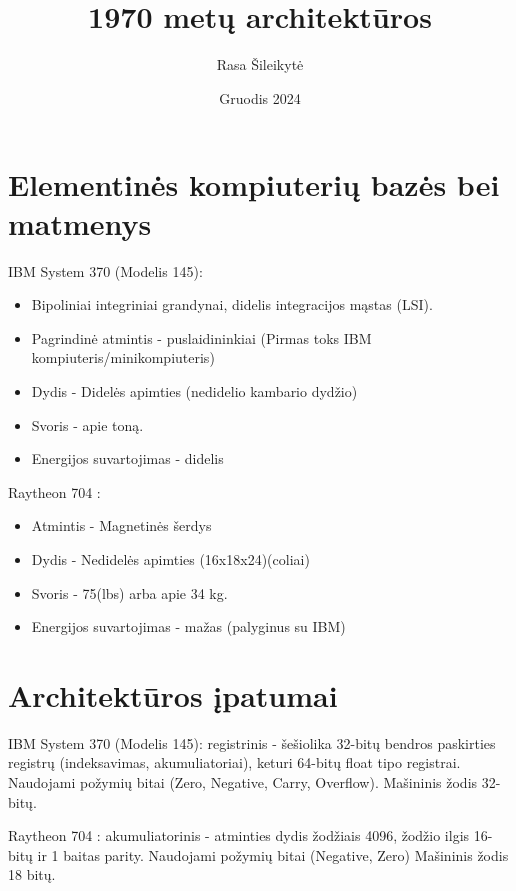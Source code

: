 \documentclass{article}
\title{\bold{IBM System 370 vs. Raytheon 704} \\1970 metų architektūros}
\author{Rasa Šileikytė}
\date{Gruodis 2024}
\begin{document}
\maketitle

\section*{Elementinės kompiuterių bazės bei matmenys}
\begin{multicols}{2}
IBM System 370 (Modelis 145):
\begin{itemize}
\item Bipoliniai integriniai grandynai, didelis integracijos mąstas (LSI).
\item Pagrindinė atmintis - puslaidininkiai (Pirmas toks IBM kompiuteris/minikompiuteris)
\item Dydis - Didelės apimties (nedidelio kambario dydžio)
\item Svoris - apie toną.
\item Energijos suvartojimas - didelis
\end{itemize}

\columnbreak

Raytheon 704 :
\begin{itemize}
\item Atmintis - Magnetinės šerdys
\item Dydis - Nedidelės apimties (16x18x24)(coliai)
\item Svoris - 75(lbs) arba apie 34 kg.
\item Energijos suvartojimas - mažas (palyginus su IBM)
\end{itemize}
\end{multicols}
\section*{Architektūros įpatumai}
\begin{multicols}{2}
IBM System 370 (Modelis 145): registrinis - šešiolika 32-bitų bendros paskirties registrų (indeksavimas, akumuliatoriai), keturi 64-bitų float tipo registrai. Naudojami požymių bitai (Zero, Negative, Carry, Overflow). Mašininis žodis 32-bitų.

\columnbreak
Raytheon 704 : akumuliatorinis - atminties dydis žodžiais 4096, žodžio ilgis 16-bitų ir 1 baitas parity. Naudojami požymių bitai (Negative, Zero) Mašininis žodis 18 bitų.
\end{multicols}
\end{document}
